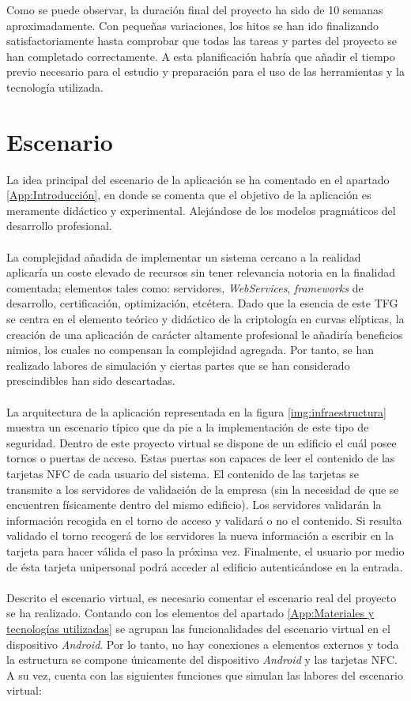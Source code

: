 \documentclass[../PFC.tex]{subfiles}
\begin{document}
Como se puede observar, la duración final del proyecto ha sido de 10 semanas aproximadamente. Con pequeñas variaciones, los hitos se han ido finalizando satisfactoriamente hasta comprobar que todas las tareas y partes del proyecto se han completado correctamente. A esta planificación habría que añadir el tiempo previo necesario para el estudio y preparación para el uso de las herramientas y la tecnología utilizada.

\section{Escenario}
\label{App:Escenario}

La idea principal del escenario de la aplicación se ha comentado en el apartado \ref{App:Introducción}, en donde se comenta que el objetivo de la aplicación es meramente didáctico y experimental. Alejándose de los modelos pragmáticos del desarrollo profesional. 
\\\\
La complejidad añadida de implementar un sistema cercano a la realidad aplicaría un coste elevado de recursos sin tener relevancia notoria en la finalidad comentada; elementos tales como: servidores, \textit{WebServices}, \textit{frameworks} de desarrollo, certificación, optimización, etcétera. Dado que la esencia de este TFG se centra en el elemento teórico y didáctico de la criptología en curvas elípticas, la creación de una aplicación de carácter altamente profesional le añadiría beneficios nimios, los cuales no compensan la complejidad agregada. Por tanto, se han realizado labores de simulación y ciertas partes que se han considerado prescindibles han sido descartadas.
\\\\
La arquitectura de la aplicación representada en la figura \ref{img:infraestructura} muestra un escenario típico que da pie a la implementación de este tipo de seguridad. Dentro de este proyecto virtual se dispone de un edificio el cuál posee tornos o puertas de acceso. Estas puertas son capaces de leer el contenido de las tarjetas NFC de cada usuario del sistema. El contenido de las tarjetas se transmite a los servidores de validación de la empresa (sin la necesidad de que se encuentren físicamente dentro del mismo edificio). Los servidores validarán la información recogida en el torno de acceso y validará o no el contenido. Si resulta validado el torno recogerá de los servidores la nueva información a escribir en la tarjeta para hacer válida el paso la próxima vez. Finalmente, el usuario por medio de ésta tarjeta unipersonal podrá acceder al edificio autenticándose en la entrada.
\\\\
Descrito el escenario virtual, es necesario comentar el escenario real del proyecto se ha realizado. Contando con los elementos del apartado \ref{App:Materiales y tecnologías utilizadas} se agrupan las funcionalidades del escenario virtual en el dispositivo \textit{Android}. Por lo tanto, no hay conexiones a elementos externos y toda la estructura se compone únicamente del dispositivo \textit{Android} y las tarjetas NFC. A su vez, cuenta con las siguientes funciones que simulan las labores del escenario virtual:
\end{document}
